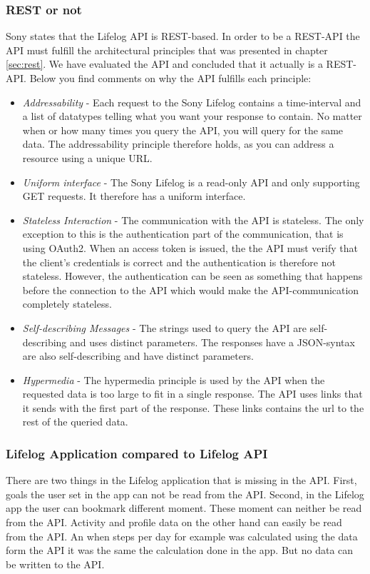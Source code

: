 \documentclass{cslthse-msc}
\begin{document}

\subsubsection{REST or not}

Sony states that the Lifelog API is REST-based. In order to be a REST-API the API must fulfill the architectural principles that was presented in chapter \ref{sec:rest}. We have evaluated the API and concluded that it actually is a REST-API. Below you find comments on why the API fulfills each principle: 

\begin{itemize}
    \item \emph{Addressability} - Each request to the Sony Lifelog contains a time-interval and a list of datatypes telling what you want your response to contain. No matter when or how many times you query the API, you will query for the same data. The addressability principle therefore holds, as you can address a resource using a unique URL. 
    \item \emph{Uniform interface} - The Sony Lifelog is a read-only API and only supporting GET requests. It therefore has a uniform interface.
    \item \emph{Stateless Interaction} - The communication with the API is stateless. The only exception to this is the authentication part of the communication, that is using OAuth2. When an access token is issued, the the API must verify that the client's credentials is correct and the authentication is therefore not stateless. However, the authentication can be seen as something that happens before the connection to the API which would make the API-communication completely stateless. 
    \item \emph{Self-describing Messages} - The strings used to query the API are self-describing and uses distinct parameters. The responses have a JSON-syntax are also self-describing and have distinct parameters. 
    \item \emph{Hypermedia} - The hypermedia principle is used by the API when the requested data is too large to fit in a single response. The API uses links that it sends with the first part of the response. These links contains the url to the rest of the queried data.

\end{itemize}

\subsubsection{Lifelog Application compared to Lifelog API}
There are two things in the Lifelog application that is missing in the API. First, goals the user set in the app can not be read from the API. Second, in the Lifelog app the user can bookmark different moment. These moment can neither be read from the API. Activity and profile data on the other hand can easily be read from the API. An when steps per day for example was calculated using the data form the API it was the same the calculation done in the app. But no data can be written to the API.
\end{document}
